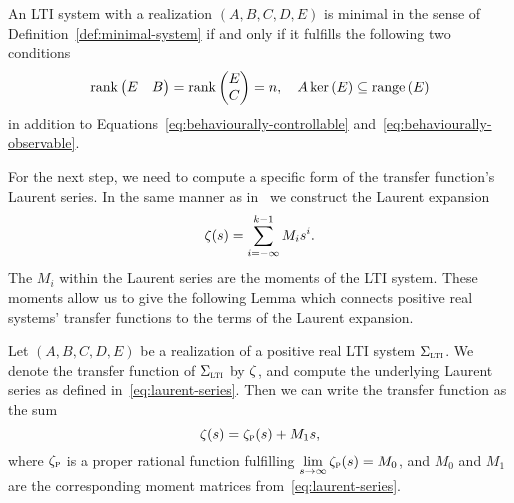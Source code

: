 \begin{lemma}\label{lem:minimality-conditions}
    An \ac{LTI} system with a realization $(A, B, C, D, E)$ is minimal in the sense of Definition~\ref{def:minimal-system} if and only if it fulfills the following two conditions
    \begin{equation*}
        \mathop{}\!\mathrm{rank}\left(\begin{matrix}
            E & B
        \end{matrix}\right) = \mathop{}\!\mathrm{rank}\left(\begin{matrix}
            E \\
            C
        \end{matrix}\right) = n,\quad A \mathop{}\!\mathrm{ker}\left(E\right) \subseteq \mathop{}\!\mathrm{range}\left(E\right)
    \end{equation*}
    in addition to Equations~\eqref{eq:behaviourally-controllable} and~\eqref{eq:behaviourally-observable}.
\end{lemma}

For the next step, we need to compute a specific form of the transfer function's Laurent series.
In the same manner as in~\cite[Section~5]{CGH2022} we construct the Laurent expansion
\begin{equation}\label{eq:laurent-series}
    \zeta(s) = \sum\limits_{i = -\infty}^{k - 1} M_i s^i.
\end{equation}
The $M_i$ within the Laurent series are the moments of the \ac{LTI} system.
These moments allow us to give the following Lemma which connects positive real systems' transfer functions to the terms of the Laurent expansion.

\begin{lemma}\label{lem:lti-laurent-series}
    Let $(A, B, C, D, E)$ be a realization of a positive real \ac{LTI} system $\Sigma_{\textnormal{\scshape lti}}$.
    We denote the transfer function of $\Sigma_{\textnormal{\scshape lti}}$ by $\zeta$, and compute the underlying Laurent series as defined in~\eqref{eq:laurent-series}.
    Then we can write the transfer function as the sum
    \begin{equation}\label{eq:pr-lti-laurent-series}
        \zeta(s) = \zeta_{\textnormal{\scshape p}}(s) + M_1 s,
    \end{equation}
    where $\zeta_{\textnormal{\scshape p}}$ is a proper rational function fulfilling $\lim\limits_{s \to \infty} \zeta_{\textnormal{\scshape p}}(s) = M_0$, and $M_0$ and $M_1$ are the corresponding moment matrices from~\eqref{eq:laurent-series}.
\end{lemma}


